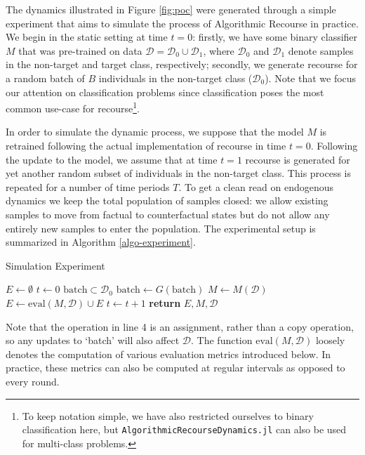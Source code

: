 \documentclass[conference,final,]{IEEEtran}
\theoremstyle{definition}
\theoremstyle{definition}
\theoremstyle{definition}
\theoremstyle{definition}
\theoremstyle{remark}
\begin{document}
The dynamics illustrated in Figure \ref{fig:poc} were generated through a simple experiment that aims to simulate the process of Algorithmic Recourse in practice. We begin in the static setting at time \(t=0\): firstly, we have some binary classifier \(M\) that was pre-trained on data \(\mathcal{D}=\mathcal{D}_0 \cup \mathcal{D}_1\), where \(\mathcal{D}_0\) and \(\mathcal{D}_1\) denote samples in the non-target and target class, respectively; secondly, we generate recourse for a random batch of \(B\) individuals in the non-target class (\(\mathcal{D}_0\)). Note that we focus our attention on classification problems since classification poses the most common use-case for recourse\footnote{To keep notation simple, we have also restricted ourselves to binary classification here, but \texttt{AlgorithmicRecourseDynamics.jl} can also be used for multi-class problems.}.

In order to simulate the dynamic process, we suppose that the model \(M\) is retrained following the actual implementation of recourse in time \(t=0\). Following the update to the model, we assume that at time \(t=1\) recourse is generated for yet another random subset of individuals in the non-target class. This process is repeated for a number of time periods \(T\). To get a clean read on endogenous dynamics we keep the total population of samples closed: we allow existing samples to move from factual to counterfactual states but do not allow any entirely new samples to enter the population. The experimental setup is summarized in Algorithm \ref{algo-experiment}.

\begin{algorithm}
\caption{Simulation Experiment}\label{algo-experiment}
\begin{algorithmic}[1]
\State $E\gets \emptyset$ 
\State $t\gets 0$
\State $\text{batch} \subset \mathcal{D}_0$ 
\State $\text{batch}\gets G(\text{batch})$ 
\State $M\gets M(\mathcal{D})$ 
\State $E\gets \text{eval}(M,\mathcal{D}) \cup E$ 
\State $t\gets t+1$ 
\EndWhile
\State \textbf{return} $E, M,\mathcal{D}$
\EndProcedure
\end{algorithmic}
\end{algorithm}

Note that the operation in line 4 is an assignment, rather than a copy operation, so any updates to `batch' will also affect \(\mathcal{D}\). The function \(\text{eval}(M,\mathcal{D})\) loosely denotes the computation of various evaluation metrics introduced below. In practice, these metrics can also be computed at regular intervals as opposed to every round.
\end{document}
